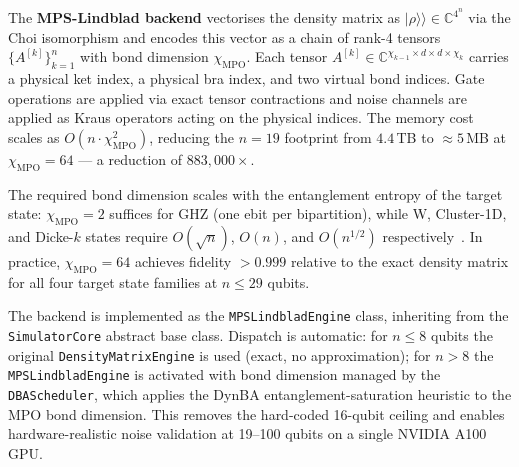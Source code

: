 The \textbf{MPS-Lindblad backend} vectorises the density matrix as
$|\rho\rangle\rangle \in \mathbb{C}^{4^n}$ via the Choi isomorphism
and encodes this vector as a chain of rank-4 tensors
$\{A^{[k]}\}_{k=1}^n$ with bond dimension $\chi_{\mathrm{MPO}}$.
Each tensor $A^{[k]} \in \mathbb{C}^{\chi_{k-1} \times d \times d \times \chi_k}$
carries a physical ket index, a physical bra index, and two virtual
bond indices. Gate operations are applied via exact tensor contractions
and noise channels are applied as Kraus operators acting on the physical
indices. The memory cost scales as $O(n \cdot \chi_{\mathrm{MPO}}^2)$,
reducing the $n = 19$ footprint from $4.4$\,TB to $\approx 5$\,MB at
$\chi_{\mathrm{MPO}} = 64$ --- a reduction of $883{,}000\times$.

The required bond dimension scales with the entanglement entropy of the
target state: $\chi_{\mathrm{MPO}} = 2$ suffices for GHZ (one ebit per
bipartition), while W, Cluster-1D, and Dicke-$k$ states require
$O(\sqrt{n})$, $O(n)$, and $O(n^{1/2})$ respectively~\cite{Salberger2017}.
In practice, $\chi_{\mathrm{MPO}} = 64$ achieves fidelity $> 0.999$
relative to the exact density matrix for all four target state families
at $n \leq 29$ qubits.

The backend is implemented as the \texttt{MPSLindbladEngine} class,
inheriting from the \texttt{SimulatorCore} abstract base class.
Dispatch is automatic: for $n \leq 8$ qubits the original
\texttt{DensityMatrixEngine} is used (exact, no approximation);
for $n > 8$ the \texttt{MPSLindbladEngine} is activated with bond
dimension managed by the \texttt{DBAScheduler}, which applies the
DynBA entanglement-saturation heuristic to the MPO bond dimension.
This removes the hard-coded 16-qubit ceiling and enables
hardware-realistic noise validation at 19--100 qubits on a single NVIDIA A100 GPU.

\begin{table}[ht]
  \centering
  \caption{Memory comparison between the full density matrix (DM) and
    MPO backends at $\chi_{\mathrm{MPO}} = 64$.
    The MPO backend removes the 16-qubit ceiling and enables simulation
    of a 19-qubit distributed topology on a single A100 GPU.}
  \label{tab:mpo_scaling}
\end{table}

